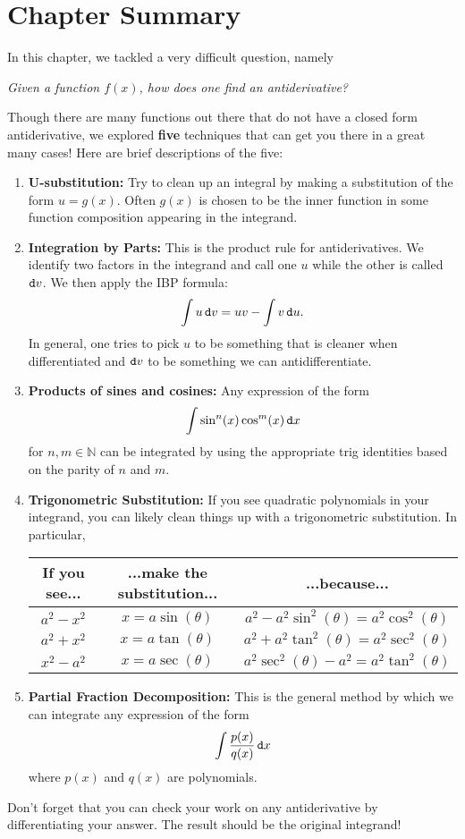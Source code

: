 \section{Chapter Summary}

In this chapter, we tackled a very difficult question, namely \begin{center}
\emph{Given a function $f(x)$, how does one find an antiderivative?}
\end{center}  Though there are many functions out there that do not have a closed form antiderivative, we explored {\bf five} techniques that can get you there in a great many cases!  Here are brief descriptions of the five:

\begin{enumerate}
\item {\bf U-substitution:} Try to clean up an integral by making a substitution of the form $u=g(x)$.  Often $g(x)$ is chosen to be the inner function in some function composition appearing in the integrand.  

\item {\bf Integration by Parts:} This is the product rule for antiderivatives.  We identify two factors in the integrand and call one $u$ while the other is called $\mathop{}\!\mathtt{d} v$.  We then apply the IBP formula: $$\int u\mathop{}\!\mathtt{d} v=uv-\int v\mathop{}\!\mathtt{d} u.$$  In general, one tries to pick $u$ to be something that is cleaner when differentiated and $\mathop{}\!\mathtt{d} v$ to be something we can antidifferentiate.
\item {\bf Products of sines and cosines:} Any expression of the form $$\int \sin^n(x)\cos^m(x) \mathop{}\!\mathtt{d} x$$
for $n,m\in \mathbb{N}$ can be integrated by using the appropriate trig identities based on the parity of $n$ and $m$.
\item {\bf Trigonometric Substitution:} If you see quadratic polynomials in your integrand, you can likely clean things up with a trigonometric substitution.  In particular, 
\begin{center}
\begin{tabular}{|c|c|c|} \hline 
 If you see... &   ...make the substitution... & ...because...  \\ \hline 
 $a^2-x^2$ &  $  x=a \sin\left(\theta\right) $ & $a^2-a^2\sin^2\left(\theta\right)=a^2\cos^2\left(\theta\right) $ \\
 $a^2+x^2$ &  $  x=a \tan\left(\theta\right) $ & $a^2+a^2\tan^2\left(\theta\right)=a^2\sec^2\left(\theta\right) $ \\
$x^2-a^2$ &  $  x=a \sec\left(\theta\right) $ & $a^2\sec^2\left(\theta\right)-a^2=a^2\tan^2\left(\theta\right) $ \\ \hline
\end{tabular}
\end{center}

\item {\bf Partial Fraction Decomposition:}  This is the general method by which we can integrate any expression of the form $$\int \frac{p(x)}{q(x)}\mathop{}\!\mathtt{d} x $$ where $p(x)$ and $q(x)$ are polynomials.
\end{enumerate}

Don't forget that you can check your work on any antiderivative by differentiating your answer.  The result should be the original integrand!

